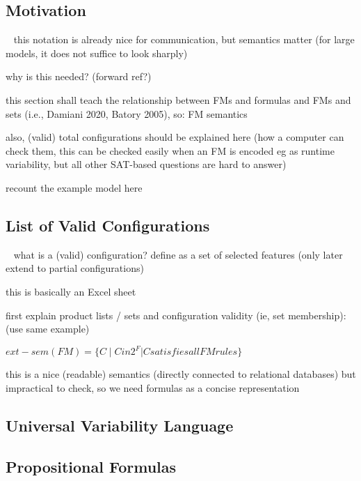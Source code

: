 \subsection{Motivation}

\begin{frame}{~}
	this notation is already nice for communication, but semantics matter (for large models, it does not suffice to look sharply)

	why is this needed? (forward ref?)

	this section shall teach the relationship between FMs and formulas and FMs and sets (i.e., Damiani 2020, Batory 2005), so: FM semantics

	also, (valid) total configurations should be explained here (how a computer can check them, this can be checked easily when an FM is encoded eg as runtime variability, but all other SAT-based questions are hard to answer)

	recount the example model here
\end{frame}

\subsection{List of Valid Configurations}

\begin{frame}{~}
	what is a (valid) configuration? define as a set of selected features (only later extend to partial configurations)

	this is basically an Excel sheet

	first explain product lists / sets and configuration validity (ie, set membership): (use same example)

	$ext-sem (FM) = \{ C \mid C in 2^F | C satisfies all FM rules \}$

	this is a nice (readable) semantics (directly connected to relational databases) but impractical to check, so we need formulas as a concise representation
\end{frame}

\subsection{Universal Variability Language}

\subsection{Propositional Formulas}

